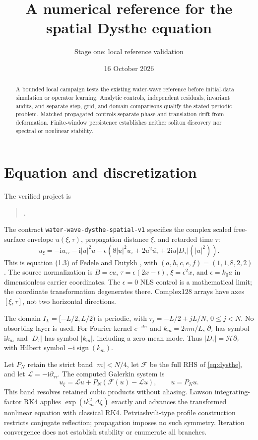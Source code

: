\documentclass[11pt]{article}
\title{A numerical reference for the spatial Dysthe equation}
\author{Stage one: local reference validation}
\date{16 October 2026}
\newcommand{\ii}{\mathrm{i}}
\newcommand{\opD}{\lvert D_\tau\rvert}
\begin{document}
\maketitle
\begin{abstract}
A bounded local campaign tests the existing water-wave reference before
initial-data simulation or operator learning. Analytic controls, independent
residuals, invariant audits, and separate step, grid, and domain comparisons
qualify the stated periodic problem. Matched propagated controls separate
phase and translation drift from deformation. Finite-window persistence
establishes neither soliton discovery nor spectral or nonlinear stability.
\end{abstract}

\section{Equation and discretization}
The verified project is
\begin{quote}\small
{}.
\end{quote}
The contract \texttt{water-wave-dysthe-spatial-v1} specifies the complex scaled
free-surface envelope $u(\xi,\tau)$, propagation distance $\xi$, and retarded
time $\tau$:
\begin{equation}\label{eq:dysthe}
 u_\xi=-\ii u_{\tau\tau}-\ii\lvert u\rvert^2u
 -\epsilon\left(8\lvert u\rvert^2u_\tau
       +2u^2\overline{u_\tau}
       +2\ii u\opD(\lvert u\rvert^2)\right).
\end{equation}
This is equation (1.3) of Fedele and Dutykh \cite{fedele2012}, with
$(a,h,c,e,f)=(1,1,8,2,2)$. The source normalization is $B=\epsilon u$,
$\tau=\epsilon(2x-t)$, $\xi=\epsilon^2x$, and $\epsilon=k_0a$ in
dimensionless carrier coordinates. The $\epsilon=0$ NLS control is a
mathematical limit; the coordinate transformation degenerates there.
Complex128 arrays have axes $[\xi,\tau]$, not two horizontal directions.

The domain $I_L=[-L/2,L/2)$ is periodic, with
$\tau_j=-L/2+jL/N$, $0\leq j<N$. No absorbing layer is used.
For Fourier kernel $e^{-\ii k\tau}$ and $k_m=2\pi m/L$,
$\partial_\tau$ has symbol $\ii k_m$ and $\opD$ has symbol
$\lvert k_m\rvert$, including a zero mean mode. Thus
$\opD=\mathcal H\partial_\tau$ with Hilbert symbol
$-\ii\operatorname{sign}(k_m)$.

Let $P_N$ retain the strict band $\lvert m\rvert<N/4$, let $\mathcal F$
be the full RHS of \eqref{eq:dysthe}, and let
$\mathcal L=-\ii\partial_{\tau\tau}$. The computed Galerkin system is
\begin{equation}\label{eq:galerkin}
 u_\xi=\mathcal L u+P_N(\mathcal F(u)-\mathcal L u),\qquad u=P_Nu.
\end{equation}
This band resolves retained cubic products without aliasing. Lawson
integrating-factor RK4 applies $\exp(\ii k_m^2\Delta\xi)$ exactly and
advances the transformed nonlinear equation with classical RK4.
Petviashvili-type profile construction restricts conjugate reflection;
propagation imposes no such symmetry. Iteration convergence does not
establish stability or enumerate all branches.
\end{document}
